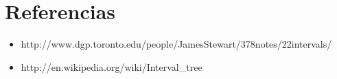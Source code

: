 \documentclass[spanish, a4paper, 11pt]{article}
\begin{document}
\clearpage


\clearpage







\clearpage
\section{Referencias}
\begin{itemize}
\item http://www.dgp.toronto.edu/people/JamesStewart/378notes/22intervals/
\item http://en.wikipedia.org/wiki/Interval\_tree
\end{itemize}
\end{document}
